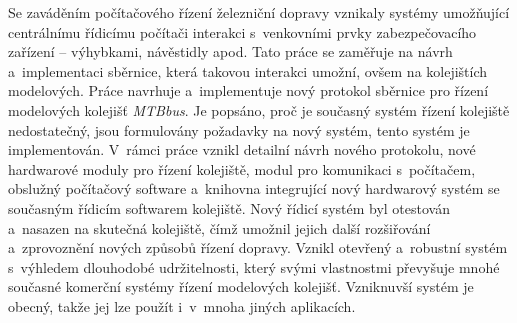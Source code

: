 Se zaváděním počítačového řízení železniční dopravy vznikaly systémy umožňující
centrálnímu řídicímu počítači interakci s~venkovními prvky zabezpečovacího
zařízení – výhybkami, návěstidly apod. Tato práce se zaměřuje na návrh
a~implementaci sběrnice, která takovou interakci umožní, ovšem na kolejištích
modelových. Práce navrhuje a~implementuje nový protokol sběrnice pro řízení
modelových kolejišť \textit{MTBbus}. Je popsáno, proč je současný systém řízení
kolejiště nedostatečný, jsou formulovány požadavky na nový systém, tento systém
je implementován. V~rámci práce vznikl detailní návrh nového protokolu, nové
hardwarové moduly pro řízení kolejiště, modul pro komunikaci s~počítačem,
obslužný počítačový software a~knihovna integrující nový hardwarový systém se
současným řídicím softwarem kolejiště.  Nový řídicí systém byl otestován
a~nasazen na skutečná kolejiště, čímž umožnil jejich další rozšiřování
a~zprovoznění nových způsobů řízení dopravy. Vznikl otevřený a~robustní systém
s~výhledem dlouhodobé udržitelnosti, který svými vlastnostmi převyšuje mnohé
současné komerční systémy řízení modelových kolejišť.  Vzniknuvší systém je
obecný, takže jej lze použít i~v~mnoha jiných aplikacích.
